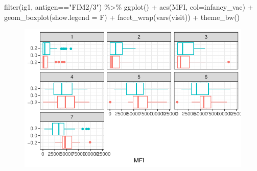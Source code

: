 \documentclass[
  letterpaper,
  DIV=11,
  numbers=noendperiod]{scrartcl}
\newenvironment{Shaded}{\begin{snugshade}}{\end{snugshade}}
\newcommand{\AttributeTok}[1]{\textcolor[rgb]{0.40,0.45,0.13}{#1}}
\newcommand{\FunctionTok}[1]{\textcolor[rgb]{0.28,0.35,0.67}{#1}}
\newcommand{\NormalTok}[1]{\textcolor[rgb]{0.00,0.23,0.31}{#1}}
\newcommand{\SpecialCharTok}[1]{\textcolor[rgb]{0.37,0.37,0.37}{#1}}
\newcommand{\StringTok}[1]{\textcolor[rgb]{0.13,0.47,0.30}{#1}}
\begin{document}
\begin{Shaded}
\begin{Highlighting}[]
\FunctionTok{filter}\NormalTok{(ig1, antigen}\SpecialCharTok{==}\StringTok{"FIM2/3"}\NormalTok{) }\SpecialCharTok{\%\textgreater{}\%}
  \FunctionTok{ggplot}\NormalTok{() }\SpecialCharTok{+}
  \FunctionTok{aes}\NormalTok{(MFI, }\AttributeTok{col=}\NormalTok{infancy\_vac) }\SpecialCharTok{+}
  \FunctionTok{geom\_boxplot}\NormalTok{(}\AttributeTok{show.legend =}\NormalTok{ F) }\SpecialCharTok{+}
  \FunctionTok{facet\_wrap}\NormalTok{(}\FunctionTok{vars}\NormalTok{(visit)) }\SpecialCharTok{+}
  \FunctionTok{theme\_bw}\NormalTok{()}
\end{Highlighting}
\end{Shaded}

\begin{figure}[H]

{\centering \includegraphics{Class19_files/figure-pdf/unnamed-chunk-27-1.pdf}

}

\end{figure}
\end{document}

